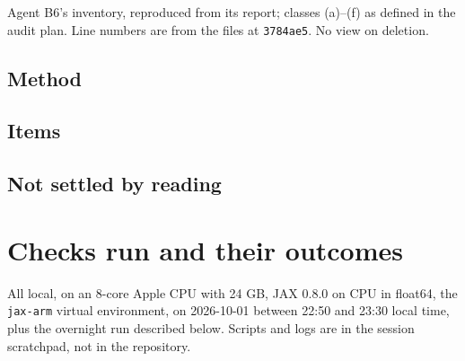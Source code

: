 \documentclass[11pt,a4paper]{article}
\newcommand{\tabdir}{audit_2026-10-01}
\newcommand{\code}[1]{\texttt{#1}}
\begin{document}
Agent B6's inventory, reproduced from its report; classes (a)--(f) as defined in the audit plan. Line numbers are from the files at \code{3784ae5}. No view on deletion.

\footnotesize
\subsection*{Method}

\subsection*{Items}

\subsection*{Not settled by reading}

\normalsize

\section{Checks run and their outcomes}

All local, on an 8-core Apple CPU with 24 GB, JAX 0.8.0 on CPU in float64, the \code{jax-arm} virtual environment, on 2026-10-01 between 22:50 and 23:30 local time, plus the overnight run described below. Scripts and logs are in the session scratchpad, not in the repository.
\end{document}
